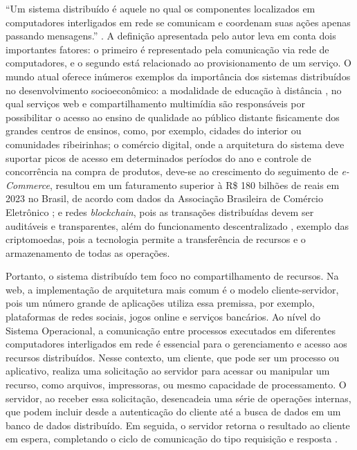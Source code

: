 ``Um sistema distribuído é aquele no qual os componentes localizados em computadores interligados em rede se comunicam e coordenam suas ações apenas passando mensagens.'' \cite[pp. 1]{sistemas-distribuidos-coulouris2013}.
A definição apresentada pelo autor leva em conta dois importantes fatores: o primeiro é representado pela comunicação via rede de computadores, e o segundo está relacionado ao provisionamento de um serviço.
O mundo atual oferece inúmeros exemplos da importância dos sistemas distribuídos no desenvolvimento socioeconômico: a modalidade de educação à distância \cite{mec-ead}, no qual serviços web e compartilhamento
multimídia são responsáveis por possibilitar o acesso ao ensino de qualidade ao público distante fisicamente dos grandes centros de ensinos, como, por exemplo, cidades do interior ou comunidades ribeirinhas; o comércio digital, onde a arquitetura do sistema deve suportar picos de acesso em determinados períodos do ano e controle
de concorrência na compra de produtos, deve-se ao crescimento do seguimento de \textit{e-Commerce},
resultou em um faturamento superior à R\$ 180 bilhões de reais em 2023 no Brasil, de acordo com dados da Associação Brasileira de Comércio Eletrônico \cite{abcomm-ecomerce}; e redes \textit{blockchain}, pois as transações distribuídas devem ser auditáveis e transparentes, além do funcionamento descentralizado \cite{juliana-blockchain}, exemplo 
das criptomoedas, pois a tecnologia permite a transferência de recursos e o armazenamento de todas as operações.  

Portanto, o sistema distribuído tem foco no compartilhamento de recursos. Na web, a implementação de arquitetura mais comum é o modelo cliente-servidor, pois
um número grande de aplicações utiliza essa premissa, por exemplo, plataformas de redes sociais, jogos online e serviços bancários.
Ao nível do Sistema Operacional, a comunicação entre processos executados em diferentes computadores interligados em rede é essencial para o gerenciamento e acesso aos recursos distribuídos.
Nesse contexto, um cliente, que pode ser um processo ou aplicativo, realiza uma solicitação ao servidor para acessar ou manipular um recurso, como arquivos, impressoras, ou mesmo capacidade de processamento. O servidor, 
ao receber essa solicitação, desencadeia uma série de operações internas, que podem incluir desde a autenticação do cliente até a busca de dados em um banco de dados distribuído. Em seguida, o servidor 
retorna o resultado ao cliente em espera, completando o ciclo de comunicação do tipo requisição e resposta \cite[pp. 16]{sistemas-distribuidos-coulouris2013}.

